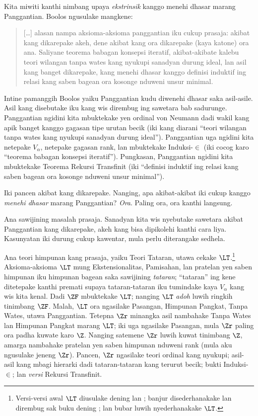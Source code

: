\documentclass[../../../include/open-logic-section]{subfiles}
\begin{document}

Kita miwiti kanthi nimbang upaya
\emph{ekstrinsik} kanggo menehi dhasar marang
Panggantian. Boolos ngusulake mangkene:
\begin{quote}
  [\ldots] alasan nampa aksioma-aksioma panggantian
  iku cukup prasaja: akibat kang dikarepake akeh,
  dene akibat kang ora dikarepake (kaya katone)
  ora ana. Saliyane teorema babagan konsepsi
  iteratif, akibat-akibate kalebu teori wilangan
  tanpa wates kang nyukupi sanadyan durung ideal,
  lan asil kang banget dikarepake, kang menehi
  dhasar kanggo definisi induktif ing relasi kang
  saben bagean ora kosonge nduweni unsur minimal.
  \citep[229]{Boolos1971}
\end{quote}		
Intine pamanggih Boolos yaiku Panggantian kudu
diwenehi dhasar saka asil-asile. Asil kang
disebutake iku kang wis dirembug ing sawetara
bab sadurunge. Panggantian ngidini kita
mbuktekake yen ordinal von Neumann dadi wakil
kang apik banget kanggo gagasan tipe urutan
becik (iki kang diarani ``teori wilangan tanpa
wates kang nyukupi sanadyan durung ideal'').
Panggantian uga ngidini kita netepake
$V_\alpha$, netepake gagasan rank, lan
mbuktekake Induksi-$\in$ (iki cocog karo
``teorema babagan konsepsi iteratif'').
Pungkasan, Panggantian ngidini kita
mbuktekake Teorema Rekursi Transfinit (iki
``definisi induktif ing relasi kang saben bagean
ora kosonge nduweni unsur minimal'').

Iki pancen akibat kang dikarepake. Nanging,
apa akibat-akibat iki cukup kanggo
\emph{menehi dhasar} marang Panggantian?
\emph{Ora}. Paling ora, ora kanthi langsung.

Ana sawijining masalah prasaja. Sanadyan kita
wis nyebutake sawetara akibat Panggantian kang
dikarepake, akeh kang bisa dipikolehi kanthi
cara liya. Kasunyatan iki durung cukup kawentar,
mula perlu diterangake sedhela.

Ana teori himpunan kang prasaja, yaiku Teori
Tataran, utawa cekake $\LT$.\footnote{Versi-versi
awal $\LT$ diusulake dening \citet{Montague1965}
lan \citet{Scott1974}; banjur disederhanakake
lan dirembug sak buku dening \citet{Potter2004};
lan bubar \citet{ButtonLT1} luwih
nyederhanakake $\LT$.} Aksioma-aksioma $\LT$
mung Ekstensionalitas, Pamisahan, lan pratelan
yen saben himpunan iku himpunan bagean saka
sawijining \emph{tataran}; ``tataran'' ing kene
ditetepake kanthi premati supaya tataran-tataran
iku tumindake kaya $V_\alpha$ kang wis kita
kenal. Dadi $\ZF$ mbuktekake $\LT$; nanging
$\LT$ \emph{adoh} luwih ringkih tinimbang
$\ZF$. Malah, $\LT$ ora ngasilake Pasangan,
Himpunan Pangkat, Tanpa Wates, utawa Panggantian.
Tetepna $\Zr$ minangka asil nambahake Tanpa Wates
lan Himpunan Pangkat marang $\LT$; iki uga
ngasilake Pasangan, mula $\Zr$ paling ora padha
kuwate karo $\Z$. Nanging satemene $\Zr$
luwih kuwat tinimbang $\Z$, amarga nambahake
pratelan yen saben himpunan nduweni rank (mula
aku ngusulake jeneng $\Zr$). Pancen, $\Zr$
ngasilake teori ordinal kang nyukupi; asil-asil
kang mbagi hierarki dadi tataran-tataran kang
terurut becik; bukti Induksi-$\in$; lan
\emph{versi} Rekursi Transfinit.
\end{document}
